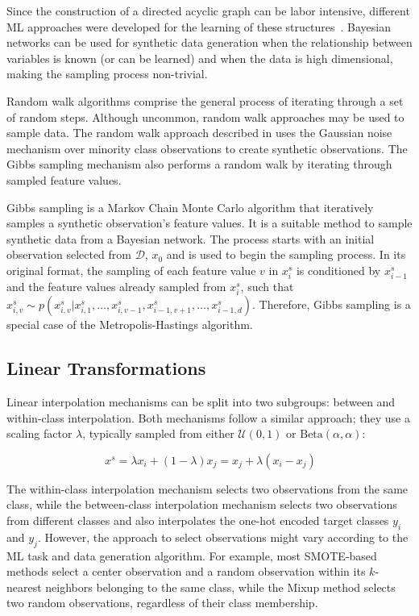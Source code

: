 Since the construction of a directed acyclic graph can be labor intensive,
different ML approaches were developed for the learning of these
structures~\cite{yu2019dag}. Bayesian networks can be used for synthetic data
generation when the relationship between variables is known (or can be
learned) and when the data is high dimensional, making the sampling process
non-trivial.

Random walk algorithms comprise the general process of iterating through a set
of random steps. Although uncommon, random walk approaches may be used to
sample data. The random walk approach described in \citet{zhang2014rwo} uses
the Gaussian noise mechanism over minority class observations to create
synthetic observations. The Gibbs sampling mechanism also performs a random
walk by iterating through sampled feature values.

Gibbs sampling is a Markov Chain Monte Carlo algorithm that iteratively
samples a synthetic observation's feature values. It is a suitable method to
sample synthetic data from a Bayesian network. The process starts with an
initial observation selected from $\mathcal{D}$, $x_0$ and is used to begin
the sampling process. In its original format, the sampling of each feature
value $v$ in $x^s_i$ is conditioned by $x^s_{i-1}$ and the feature values
already sampled from $x^s_i$, such that $x^s_{i, v} \sim p(x^s_{i, v} |
x^s_{i, 1}, \ldots, x^s_{i, v-1}, x^s_{i-1, v+1}, \dots, x^s_{i-1, d})$.
Therefore, Gibbs sampling is a special case of the Metropolis-Hastings
algorithm.

\subsection{Linear Transformations}

Linear interpolation mechanisms can be split into two subgroups: between and
within-class interpolation. Both mechanisms follow a similar approach; they
use a scaling factor $\lambda$, typically sampled from either
$\mathcal{U}(0,1)$ or $\text{Beta}(\alpha, \alpha)$: 

\begin{equation}~\label{eq:interpolation}
    x^s = \lambda x_i + (1-\lambda)x_j = x_j + \lambda(x_i - x_j)
\end{equation}

The within-class interpolation mechanism selects two observations from the
same class, while the between-class interpolation mechanism selects two
observations from different classes and also interpolates the one-hot encoded
target classes $y_i$ and $y_j$. However, the approach to select observations
might vary according to the ML task and data generation algorithm. For
example, most SMOTE-based methods select a center observation and a random
observation within its $k$-nearest neighbors belonging to the same class,
while the Mixup method selects two random observations, regardless of their
class membership.

